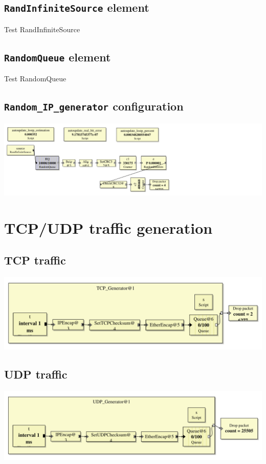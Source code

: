 \documentclass[a4paper]{article}
\begin{document}
  \subsection{\texttt{RandInfiniteSource} element}
  Test RandInfiniteSource
  \subsection{\texttt{RandomQueue} element}
  Test RandomQueue
  \subsection{\texttt{Random\_IP\_generator} configuration}
  \begin{center}
	  \includegraphics[scale=0.55]{Random_IP_generator.pdf}
	  \label{fig:randomipgenerator}
  \end{center}
   
  \section{TCP/UDP traffic generation}
  \subsection{TCP traffic}
  \begin{center}
	  \includegraphics[scale=0.55]{TCP_Source.pdf}
	  \label{fig:tcpsource}
  \end{center}
  \subsection{UDP traffic}
    \begin{center}
	  \includegraphics[scale=0.55]{UDP_Source.pdf}
	  \label{fig:udpsource}
  \end{center}
\end{document}
